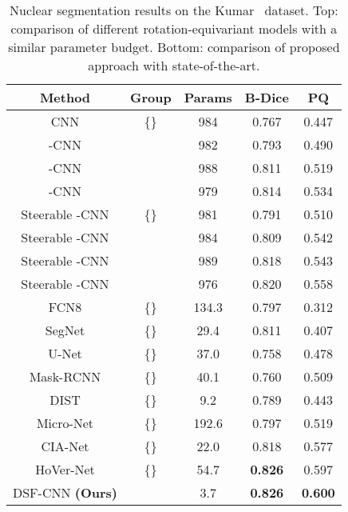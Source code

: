 \documentclass[journal]{IEEEtran}
\begin{document}
	\newcommand{\STAB}[1]{\begin{tabular}{@{}c@{}}#1\end{tabular}}
	\begin{table}[h]
		\begin{center}
			\caption{Nuclear segmentation results on the Kumar~\cite{kumar2017dataset} dataset. Top: comparison of different rotation-equivariant models with a similar parameter budget. Bottom: comparison of proposed approach with state-of-the-art.}
			\label{dup1 table:comparative_kumar}
			\setlength{\tabcolsep}{2pt} \renewcommand{\arraystretch}{1} \begin{tabular}{c|c|c|c|c}
 					     \textbf{Method}
						 & \textbf{Group} & \textbf{Params}
						 & \textbf{B-Dice} & \textbf{PQ} \\
					\midrule
					
					
CNN  & \{\} & 984 & 0.767 &     0.447 \\ 
					-CNN \cite{cohen2016group} &  & 982 & 0.793  & 0.490  \\ 
					-CNN \cite{bekkers2018roto,lafarge2020roto} &  & 988 &  0.811 &  0.519 \\ 
					-CNN \cite{bekkers2018roto,lafarge2020roto} &  & 979 &  0.814 & 0.534 \\ 
					Steerable -CNN \cite{weiler2018learning} & \{\} & 981 & 0.791  & 0.510 \\ 
					Steerable -CNN \cite{weiler2018learning} &  & 984 & 0.809  & 0.542 \\ 
					Steerable -CNN \cite{weiler2018learning} &  & 989 & 0.818  & 0.543 \\ 
					Steerable -CNN \cite{weiler2018learning} &  & 976 & 0.820  & 0.558 \\
					\midrule
					FCN8 \cite{long2015fully} & \{\} & 134.3 &  0.797  & 0.312 \\
					SegNet \cite{badrinarayanan2017segnet} & \{\} & 29.4 &  0.811 & 0.407 \\ 
					U-Net \cite{ronneberger2015u} & \{\}  & 37.0 &  0.758 & 0.478  \\ 
					Mask-RCNN \cite{mrcnn} & \{\} & 40.1 &  0.760  & 0.509 \\ 
					DIST \cite{naylor2018segmentation} & \{\} & 9.2 & 0.789  &  0.443 \\ 
					Micro-Net \cite{raza2019micro} & \{\} & 192.6 &  0.797  & 0.519  \\
					CIA-Net \cite{zhou2019cia} & \{\} & 22.0 &  0.818   & 0.577  \\ 
					HoVer-Net \cite{graham2019hover} & \{\}  & 54.7 &  \textbf{0.826}   & 0.597 \\
					DSF-CNN \textbf{(Ours)} &   & 3.7 &  \textbf{0.826}  & \textbf{0.600}   \\
					\bottomrule
				\end{tabular}
		
		\end{center}
	\end{table}
	    
\end{document}
